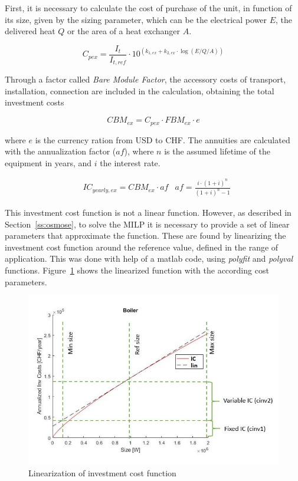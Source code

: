 \documentclass{article}
\begin{document}
First, it is necessary to calculate the cost of purchase of the unit, in function of its size, given by the sizing parameter, which can be the electrical power $E$, the delivered heat $Q$ or the area of a heat exchanger $A$.

\begin{equation}
C_{pex} = \frac{I_{t}}{I_{t,ref}} \cdot 10^ {(k_{1,ex} + k_{2,ex} \cdot \log(E/Q/A))}
\end{equation}

Through a factor called \emph{Bare Module Factor}, the accessory costs of transport, installation, connection are included in the calculation, obtaining the total investment costs

\begin{equation}
CBM_{ex} = C_{pex} \cdot FBM_{ex} \cdot e 
\end{equation}

where $e$ is the currency ration from USD to CHF. The annuities are calculated with the annualization factor ($af$), where $n$ is the assumed lifetime of the equipment in years, and $i$ the interest rate. 

\begin{align}
	& IC_{yearly,ex} = CBM_{ex} \cdot af 
	& af = \frac{i \cdot (1 + i)^n}{(1 + i)^n - 1}
\end{align}

This investment cost function is not a linear function. However, as described in Section~\ref{ss:osmose}, to solve the MILP it is necessary to provide a set of linear parameters that approximate the function. These are found by linearizing the investment cost function around the reference value, defined in the range of application. This was done with help of a matlab code, using \textit{polyfit} and \textit{polyval} functions. Figure~\ref{fig:lin} shows the linearized function with the according cost parameters.

\begin{figure}[htp]
	\centering
	\includegraphics[scale=0.6]{Images/linearization_expl.jpg}
	\caption{Linearization of investment cost function}
	\label{fig:lin}
\end{figure}
\end{document}
